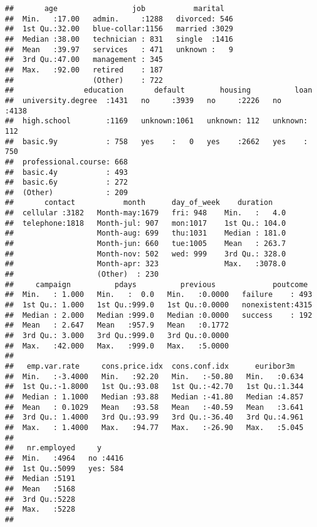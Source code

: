 \documentclass[]{article}
\begin{document}
\begin{verbatim}
##       age                 job           marital    
##  Min.   :17.00   admin.     :1288   divorced: 546  
##  1st Qu.:32.00   blue-collar:1156   married :3029  
##  Median :38.00   technician : 831   single  :1416  
##  Mean   :39.97   services   : 471   unknown :   9  
##  3rd Qu.:47.00   management : 345                  
##  Max.   :92.00   retired    : 187                  
##                  (Other)    : 722                  
##                education       default        housing          loan     
##  university.degree  :1431   no     :3939   no     :2226   no     :4138  
##  high.school        :1169   unknown:1061   unknown: 112   unknown: 112  
##  basic.9y           : 758   yes    :   0   yes    :2662   yes    : 750  
##  professional.course: 668                                               
##  basic.4y           : 493                                               
##  basic.6y           : 272                                               
##  (Other)            : 209                                               
##       contact           month      day_of_week    duration     
##  cellular :3182   Month-may:1679   fri: 948    Min.   :   4.0  
##  telephone:1818   Month-jul: 907   mon:1017    1st Qu.: 104.0  
##                   Month-aug: 699   thu:1031    Median : 181.0  
##                   Month-jun: 660   tue:1005    Mean   : 263.7  
##                   Month-nov: 502   wed: 999    3rd Qu.: 328.0  
##                   Month-apr: 323               Max.   :3078.0  
##                   (Other)  : 230                               
##     campaign          pdays          previous             poutcome   
##  Min.   : 1.000   Min.   :  0.0   Min.   :0.0000   failure    : 493  
##  1st Qu.: 1.000   1st Qu.:999.0   1st Qu.:0.0000   nonexistent:4315  
##  Median : 2.000   Median :999.0   Median :0.0000   success    : 192  
##  Mean   : 2.647   Mean   :957.9   Mean   :0.1772                     
##  3rd Qu.: 3.000   3rd Qu.:999.0   3rd Qu.:0.0000                     
##  Max.   :42.000   Max.   :999.0   Max.   :5.0000                     
##                                                                      
##   emp.var.rate     cons.price.idx  cons.conf.idx      euribor3m    
##  Min.   :-3.4000   Min.   :92.20   Min.   :-50.80   Min.   :0.634  
##  1st Qu.:-1.8000   1st Qu.:93.08   1st Qu.:-42.70   1st Qu.:1.344  
##  Median : 1.1000   Median :93.88   Median :-41.80   Median :4.857  
##  Mean   : 0.1029   Mean   :93.58   Mean   :-40.59   Mean   :3.641  
##  3rd Qu.: 1.4000   3rd Qu.:93.99   3rd Qu.:-36.40   3rd Qu.:4.961  
##  Max.   : 1.4000   Max.   :94.77   Max.   :-26.90   Max.   :5.045  
##                                                                    
##   nr.employed     y       
##  Min.   :4964   no :4416  
##  1st Qu.:5099   yes: 584  
##  Median :5191             
##  Mean   :5168             
##  3rd Qu.:5228             
##  Max.   :5228             
## 
\end{verbatim}
\end{document}
